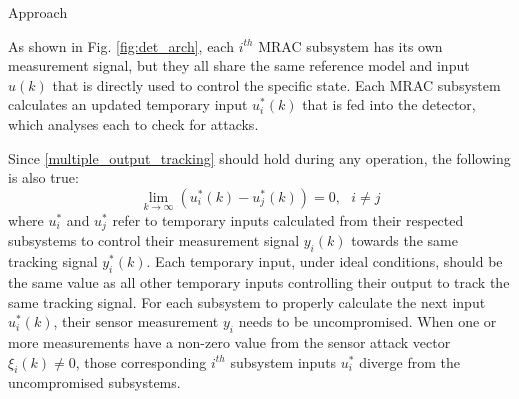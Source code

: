 \begin{section}{Approach}

	
As shown in Fig. \ref{fig:det_arch}, each $i^{th}$ MRAC subsystem has its own measurement signal, but they all share the same reference model and input $u(k)$ that is directly used to control the specific state. Each MRAC subsystem calculates an updated temporary input $u^*_i(k)$ that is fed into the detector, which analyses each to check for attacks.

Since \eqref{multiple_output_tracking} should hold during any operation, the following is also true:
\begin{equation}
    \label{eq:u_to_0}
    \lim_{k\to\infty}(u^*_i(k)-u^*_j(k))=0, \text{ }i\neq j
\end{equation}
where $u^*_i$ and $u^*_j$ refer to temporary inputs calculated from their respected subsystems to control their measurement signal $y_i(k)$ towards the same tracking signal $y_i^*(k)$. Each temporary input, under ideal conditions, should be the same value as all other temporary inputs controlling their output to track the same tracking signal. For each subsystem to properly calculate the next input $u^*_i(k)$, their sensor measurement $y_i$ needs to be uncompromised. When one or more measurements have a non-zero value from the sensor attack vector $\xi_i(k) \neq 0$, those corresponding $i^{th}$ subsystem inputs $u^*_i$ diverge from the uncompromised subsystems.


\end{section}
